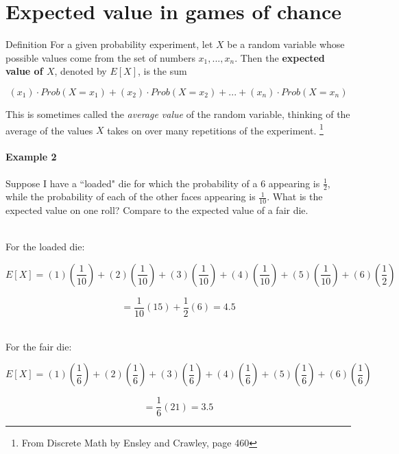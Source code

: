 \documentclass[a4paper,12pt]{book}
\title{}
\author{Rachel Morris}
\date{\today}
\begin{document}
    \togglefalse{answerkey}

    \section{Expected value in games of chance}

        \begin{intro}{Definition}
			For a given probability experiment, let $X$ be a random
			variable whose possible values come from the set of numbers
			$ x_{1}, ..., x_{n} $. Then the \textbf{expected value of $X$},
			denoted by $E[X]$, is the sum
			
			$$ (x_{1}) \cdot Prob(X = x_{1}) + (x_{2}) \cdot Prob(X = x_{2}) + ... + (x_{n}) \cdot Prob(X = x_{n}) $$
			
			This is sometimes called the \textit{average value} of the random variable,
			thinking of the average of the values $X$ takes on over many repetitions of the experiment.
            \footnote{From Discrete Math by Ensley and Crawley, page 460}
            
            \paragraph{Example 2}
            Suppose I have a ``loaded" die for which the probability of
            a 6 appearing is $\frac{1}{2}$, while the probability of each
            of the other faces appearing is $\frac{1}{10}$.
            What is the expected value on one roll? Compare to the expected
            value of a fair die.
            
            ~\\
            For the loaded die:
            
            $$E[X] = (1)(\frac{1}{10}) + (2)(\frac{1}{10}) + (3)(\frac{1}{10})
					+ (4)(\frac{1}{10}) + (5)(\frac{1}{10}) + (6)(\frac{1}{2})$$
			
			$$ = \frac{1}{10}(15) + \frac{1}{2}(6) = 4.5$$
            
            ~\\
            For the fair die:
            
            $$E[X] = (1)(\frac{1}{6}) + (2)(\frac{1}{6}) + (3)(\frac{1}{6})
					+ (4)(\frac{1}{6}) + (5)(\frac{1}{6}) + (6)(\frac{1}{6})$$
					
			$$ = \frac{1}{6}(21) = 3.5$$
        \end{intro}
        
\end{document}
